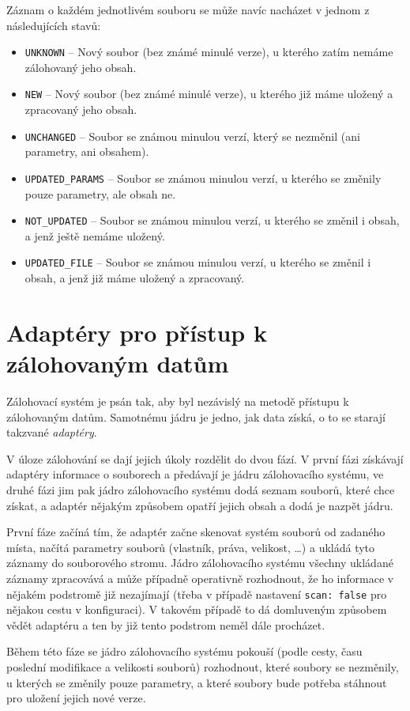 Záznam o každém jednotlivém souboru se může navíc nacházet v jednom z
následujících stavů:
\begin{itemize}
	\item\texttt{UNKNOWN} -- Nový soubor (bez známé minulé verze), u kterého
	zatím nemáme zálohovaný jeho obsah.
	\item\texttt{NEW} -- Nový soubor (bez známé minulé verze), u kterého již
	máme uložený a zpracovaný jeho obsah.
	\item\texttt{UNCHANGED} -- Soubor se známou minulou verzí, který se
	nezměnil (ani parametry, ani obsahem).
	\item\texttt{UPDATED\_PARAMS} -- Soubor se známou minulou verzí, u kterého
	se změnily pouze parametry, ale obsah ne.
	\item\texttt{NOT\_UPDATED} -- Soubor se známou minulou verzí, u kterého
	se změnil i obsah, a jenž ještě nemáme uložený.
	\item\texttt{UPDATED\_FILE} -- Soubor se známou minulou verzí, u kterého
	se změnil i obsah, a jenž již máme uložený a zpracovaný.
\end{itemize}

\section{Adaptéry pro přístup k zálohovaným datům}

Zálohovací systém je psán tak, aby byl nezávislý na metodě přístupu k zálohovaným
datům. Samotnému jádru je jedno, jak data získá, o to se starají takzvané
{\it adaptéry}.

V úloze zálohování se dají jejich úkoly rozdělit do dvou fází. V první fázi
získávají adaptéry informace o souborech a předávají je jádru zálohovacího
systému, ve druhé fázi jim pak jádro zálohovacího systému dodá seznam souborů,
které chce získat, a adaptér nějakým způsobem opatří jejich obsah a dodá je
nazpět jádru.

První fáze začíná tím, že adaptér začne skenovat systém souborů od zadaného
místa, načítá parametry souborů (vlastník, práva, velikost, \dots) a ukládá tyto
záznamy do souborového stromu. Jádro zálohovacího systému všechny ukládané
záznamy zpracovává a může případně operativně rozhodnout, že ho informace v nějakém
podstromě již nezajímají (třeba v případě nastavení \texttt{scan: false} pro
nějakou cestu v konfiguraci). V takovém případě to dá domluveným způsobem vědět
adaptéru a ten by již tento podstrom neměl dále procházet.

Během této fáze se jádro zálohovacího systému pokouší (podle cesty, času poslední
modifikace a velikosti souborů) rozhodnout, které soubory se nezměnily, u kterých
se změnily pouze parametry, a které soubory bude potřeba stáhnout pro uložení
jejich nové verze.

